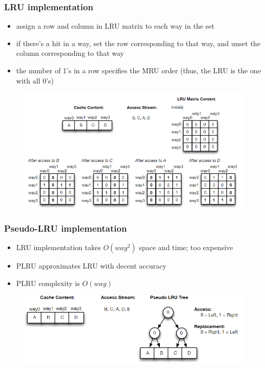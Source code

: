 \documentclass[12pt]{extarticle}
\begin{document}
	\subsubsection{LRU implementation}

	\begin{itemize}
		\item assign a row and column in LRU matrix to each way in the set
		\item if there's a hit in a way, set the row corresponding to that way, and unset the column corresponding to that way
		\item the number of 1's in a row specifies the MRU order (thus, the LRU is the one with all 0's)
	\end{itemize}

	\begin{figure}[ht!]
		\centering

		\includegraphics[width=\textwidth]{assets/lru-matrix-implementation.png}
	\end{figure}

	\subsubsection{Pseudo-LRU implementation}

	\begin{itemize}
		\item LRU implementation takes $O(way^2)$ space and time; too expensive
		\item PLRU approximates LRU with decent accuracy
		\item PLRU complexity is $O(way)$
	\end{itemize}

	\begin{figure}[ht!]
		\centering
		\includegraphics[width=\textwidth]{assets/plru-initial-state.png}
	\end{figure}
\end{document}
